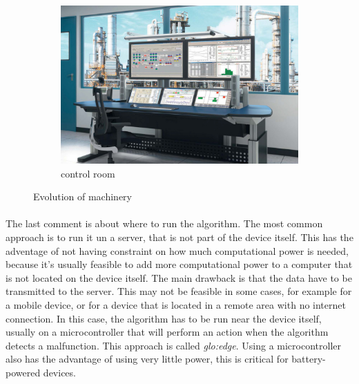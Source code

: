 \begin{figure}[htbp]
\begin{subfigure}{0.3\textwidth}
        \includegraphics[width=\textwidth]{images/Intro/control-rooms-workstations.jpg}
        \caption{control room \cite{evosite}}
        \label{fig:controlroom}
    \end{subfigure}
    \caption{Evolution of machinery}
    \label{fig:machineryevolution}
\end{figure}

\paragraph*{}
The last comment is about where to run the algorithm. The most common approach is to run it un a server, that is not part of the device itself. This has the adventage of not having constraint on how much computational power is needed, because it's usually feasible to add more computational power to a computer that is not located on the device itself. The main drawback is that the data have to be transmitted to the server. This may not be feasible in some cases, for example for a mobile device, or for a device that is located in a remote area with no internet connection. In this case, the algorithm has to be run near the device itself, usually on a microcontroller that will perform an action when the algorithm detects a malfunction. This approach is called \emph{\gls{glo:edge}}. Using a microcontroller also has the advantage of using very little power, this is critical for battery-powered devices.


